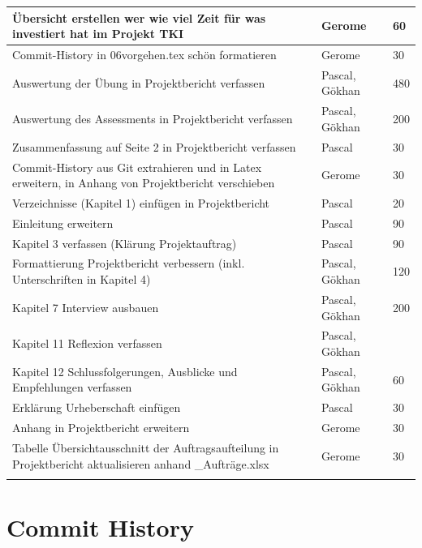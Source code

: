 \begin{longtable}{ | p{7cm} | p{4cm} | p{2cm} |}
    Übersicht erstellen wer wie viel Zeit für was investiert hat im Projekt TKI & Gerome & 60\\ \hline   
    Commit-History in 06vorgehen.tex schön formatieren & Gerome & 30 \\ \hline 
    Auswertung der Übung in Projektbericht verfassen  & Pascal, Gökhan & 480 \\ \hline   
Auswertung des Assessments in Projektbericht verfassen & Pascal, Gökhan & 200 \\ \hline  
Zusammenfassung auf Seite 2 in Projektbericht verfassen     & Pascal & 30 \\ \hline   
Commit-History aus Git extrahieren und in Latex erweitern, in Anhang von Projektbericht verschieben     & Gerome & 30 \\ \hline
 Verzeichnisse (Kapitel 1) einfügen in Projektbericht    & Pascal & 20 \\ \hline  
 Einleitung erweitern    & Pascal & 90 \\ \hline   
 Kapitel 3 verfassen (Klärung Projektauftrag)    & Pascal & 90 \\ \hline
 Formattierung Projektbericht verbessern (inkl. Unterschriften in Kapitel 4)    & Pascal, Gökhan & 120 \\ \hline  
 Kapitel 7 Interview ausbauen  & Pascal, Gökhan & 200 \\ \hline   
 Kapitel 11 Reflexion verfassen & Pascal, Gökhan &  \\ \hline    
 Kapitel 12 Schlussfolgerungen, Ausblicke und Empfehlungen    verfassen & Pascal, Gökhan & 60 \\ \hline  
 Erklärung Urheberschaft einfügen & Pascal & 30 \\ \hline   
 Anhang in Projektbericht erweitern & Gerome & 30 \\ \hline     
 Tabelle Übersichtausschnitt der Auftragsaufteilung in Projektbericht aktualisieren anhand \_Aufträge.xlsx    & Gerome & 30 \\ \hline    
     &  &  \\ \hline  
     
\end{longtable}
     
\newpage

\section*{Commit History} \label{sec:comhist}
 


